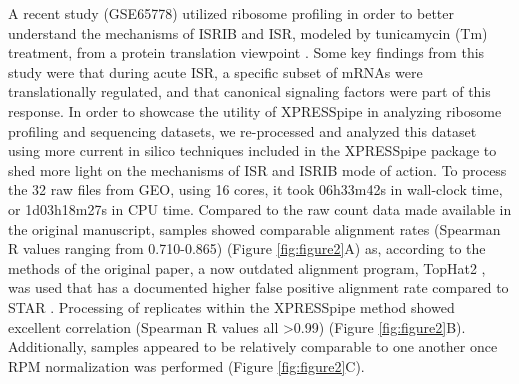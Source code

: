 \documentclass[11pt, a4paper, oneside]{article}
\begin{document}
A recent study (GSE65778) utilized ribosome profiling in order to better understand the mechanisms of ISRIB and ISR, modeled by tunicamycin (Tm) treatment, from a protein translation viewpoint \cite{isrib_riboseq}. Some key findings from this study were that during acute ISR, a specific subset of mRNAs were translationally regulated, and that canonical signaling factors were part of this response. In order to showcase the utility of XPRESSpipe in analyzing ribosome profiling and sequencing datasets, we re-processed and analyzed this dataset using more current in silico techniques included in the XPRESSpipe package to shed more light on the mechanisms of ISR and ISRIB mode of action. To process the 32 raw files from GEO, using 16 cores, it took 06h33m42s in wall-clock time, or 1d03h18m27s in CPU time. Compared to the raw count data made available in the original manuscript, samples showed comparable alignment rates (Spearman R values ranging from 0.710-0.865) (Figure \ref{fig:figure2}A) as, according to the methods of the original paper, a now outdated alignment program, TopHat2 \cite{tophat2}, was used that has a documented higher false positive alignment rate compared to STAR \cite{alignment_benchmark, star}. Processing of replicates within the XPRESSpipe method showed excellent correlation (Spearman R values all \textgreater 0.99) (Figure \ref{fig:figure2}B). Additionally, samples appeared to be relatively comparable to one another once RPM normalization was performed (Figure \ref{fig:figure2}C).
\end{document}
